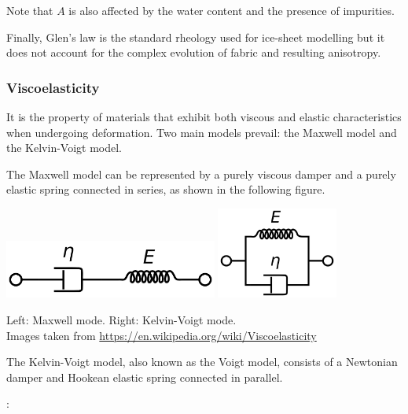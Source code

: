 Note that $A$ is also affected by the water content and the presence of impurities. 

Finally, Glen's law is the standard rheology used for ice-sheet modelling 
but it does not account for the complex evolution of fabric and resulting anisotropy.

\Literature \cite{grev97,krab16,grbl09,issg15,jidb17,heah18}

\subsubsection{Viscoelasticity} 


It is the property of materials that exhibit both viscous and elastic 
characteristics when undergoing deformation.
Two main models prevail: the Maxwell model and the Kelvin-Voigt model. 

The Maxwell model can be represented by a purely viscous damper and 
a purely elastic spring connected in series, as shown in the following figure. 

\begin{center}
\includegraphics[width=7cm]{images/rheology/Maxwell_diagram}
\hspace{1cm}
\includegraphics[width=4cm]{images/rheology/Kelvin_Voigt_diagram}

{\captionfont Left: Maxwell mode. Right: Kelvin-Voigt mode.\\ 
Images taken from \url{https://en.wikipedia.org/wiki/Viscoelasticity}}
\end{center}

The Kelvin-Voigt model, also known as the Voigt model, 
consists of a Newtonian damper and Hookean elastic spring connected in parallel.

\Literature: \cite{boph12}

